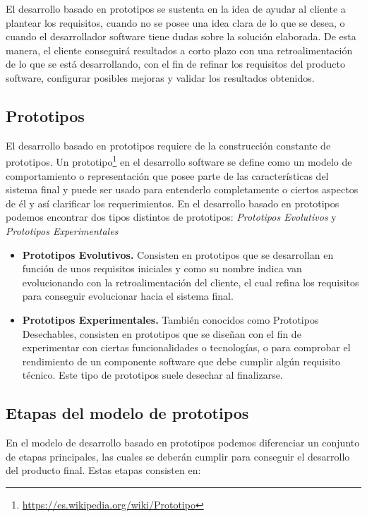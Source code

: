 El desarrollo basado en prototipos se sustenta en la idea de ayudar al cliente a plantear los requisitos, cuando no se posee una idea clara de lo que se desea, o cuando el desarrollador software tiene dudas sobre la solución elaborada. De esta manera, el cliente conseguirá resultados a corto plazo con una retroalimentación de lo que se está desarrollando, con el fin de refinar los requisitos del producto software, configurar posibles mejoras y validar los resultados obtenidos.

\subsection{Prototipos}
\label{sec:Prototipos}

El desarrollo basado en prototipos requiere de la construcción constante de prototipos. Un prototipo\footnote{\url{https://es.wikipedia.org/wiki/Prototipo}} en el desarrollo software se define como un modelo de comportamiento o representación que posee parte de las características del sistema final y puede ser usado para entenderlo completamente o ciertos aspectos de él y así clarificar los requerimientos. En el desarrollo basado en prototipos podemos encontrar dos tipos distintos de prototipos: \emph{Prototipos Evolutivos} y \emph{Prototipos Experimentales}

\begin{itemize}
	\item \textbf{Prototipos Evolutivos.} Consisten en prototipos que se desarrollan en función de unos requisitos iniciales y como su nombre indica van evolucionando con la retroalimentación del cliente, el cual refina los requisitos para conseguir evolucionar hacia el sistema final.
	\item \textbf{Prototipos Experimentales.} También conocidos como Prototipos Desechables, consisten en prototipos que se diseñan con el fin de experimentar con ciertas funcionalidades o tecnologías, o para comprobar el rendimiento de un componente software que debe cumplir algún requisito técnico. Este tipo de prototipos suele desechar al finalizarse.
\end{itemize}

\subsection{Etapas del modelo de prototipos}
\label{sec:EtapasPrototipos}

En el modelo de desarrollo basado en prototipos podemos diferenciar un conjunto de etapas principales, las cuales se deberán cumplir para conseguir el desarrollo del producto final. Estas etapas consisten en:


